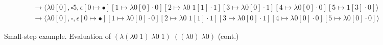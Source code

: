 \begin{sidewaysfigure}
\begin{align*}
&\rightarrow\langle \lambda0[0],\square 5,\epsilon[0\mapsto\bullet][1\mapsto\lambda0[0]\cdot0][2\mapsto\lambda0\;1[1]\cdot1][3\mapsto\lambda0[0]\cdot1][4\mapsto\lambda0[0]\cdot0][5\mapsto1[3]\cdot0]\rangle\\ 
&\rightarrow\langle \lambda0[0],\square,\epsilon[0\mapsto\bullet][1\mapsto\lambda0[0]\cdot0][2\mapsto\lambda0\;1[1]\cdot1][3\mapsto\lambda0[0]\cdot1][4\mapsto\lambda0[0]\cdot0][5\mapsto\lambda0[0]\cdot0]\rangle
\end{align*}
\caption{Small-step \ce example. Evaluation of
$(\lambda(\lambda0\;1)\;\lambda0\;1)\;((\lambda0)\;\lambda0)$ (cont.)}
\label{fig:state}
\end{sidewaysfigure}

